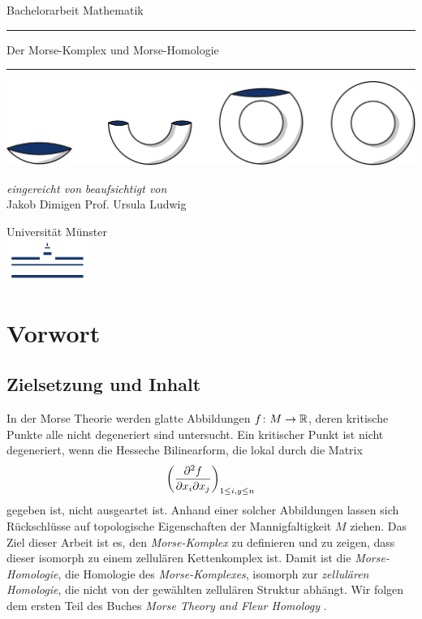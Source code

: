 \documentclass[a4paper,11pt,twoside]{scrreport}
\begin{document}
\makeheaderempty

\begin{titlepage}
    \centering
    Bachelorarbeit Mathematik \\
    \color{DarkBlue}\rule{\linewidth}{1pt}
    \color{Black}\Huge Der Morse-Komplex und Morse-Homologie \\[14pt]
    \color{DarkBlue}\rule{\linewidth}{2pt}
    \color{Black}

    \vspace{3cm}
    \includegraphics[width=\textwidth]{../resources/Me-Titlepage-Color.jpeg}

    \vfill
    \small

    \textit{eingereicht von}
    \hfill
    \textit{beaufsichtigt von} \\
    Jakob Dimigen
    \hfill
    Prof. Ursula Ludwig

    \vspace{2cm}

    Universität Münster \\
    \vspace{0.02cm}
    \includegraphics[width=0.2\textwidth]{../resources/WWU_Logo.png}
\end{titlepage}

\section*{Vorwort}

\subsection*{Zielsetzung und Inhalt}

In der Morse Theorie werden glatte Abbildungen $f \colon M \to { \mathbb R }$, deren kritische Punkte 
alle nicht degeneriert sind untersucht. Ein kritischer Punkt ist nicht degeneriert, wenn die Hesseche 
Bilinearform, die lokal durch die Matrix
\[ \left(\pdderive[f]{x_i}{x_j} \right)_{1 \leq i, y \leq n} \]
gegeben ist, nicht ausgeartet ist. Anhand einer solcher Abbildungen lassen sich
Rückschlüsse auf topologische Eigenschaften der Mannigfaltigkeit $M$ ziehen. Das Ziel dieser Arbeit
ist es, den \textit{Morse-Komplex} zu definieren und zu zeigen, dass dieser isomorph zu einem 
zellulären Kettenkomplex ist. Damit ist die \textit{Morse-Homologie}, die Homologie des 
\textit{Morse-Komplexes}, isomorph zur \textit{zellulären Homologie}, die nicht von der gewählten 
zellulären Struktur abhängt. Wir folgen dem ersten Teil des Buches 
\textit{Morse Theory and Fleur Homology} \cite{audin}. 
\end{document}
